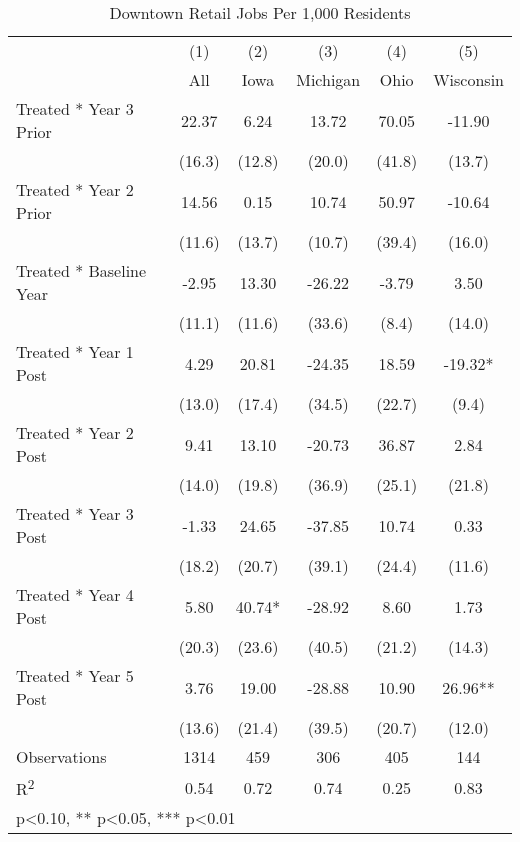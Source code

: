 \begin{table}[htbp]\centering
\def\sym#1{\ifmmode^{#1}\else\(^{#1}\)\fi}
\caption{Downtown Retail Jobs Per 1,000 Residents}
\begin{tabular}{l*{5}{c}}
\toprule
            &\multicolumn{1}{c}{(1)}   &\multicolumn{1}{c}{(2)}   &\multicolumn{1}{c}{(3)}   &\multicolumn{1}{c}{(4)}   &\multicolumn{1}{c}{(5)}   \\
            &         All   &        Iowa   &    Michigan   &        Ohio   &   Wisconsin   \\
\midrule
Treated * Year 3 Prior&       22.37   &        6.24   &       13.72   &       70.05   &      -11.90   \\
            &      (16.3)   &      (12.8)   &      (20.0)   &      (41.8)   &      (13.7)   \\
Treated * Year 2 Prior&       14.56   &        0.15   &       10.74   &       50.97   &      -10.64   \\
            &      (11.6)   &      (13.7)   &      (10.7)   &      (39.4)   &      (16.0)   \\
Treated * Baseline Year&       -2.95   &       13.30   &      -26.22   &       -3.79   &        3.50   \\
            &      (11.1)   &      (11.6)   &      (33.6)   &       (8.4)   &      (14.0)   \\
Treated * Year 1 Post&        4.29   &       20.81   &      -24.35   &       18.59   &      -19.32*  \\
            &      (13.0)   &      (17.4)   &      (34.5)   &      (22.7)   &       (9.4)   \\
Treated * Year 2 Post&        9.41   &       13.10   &      -20.73   &       36.87   &        2.84   \\
            &      (14.0)   &      (19.8)   &      (36.9)   &      (25.1)   &      (21.8)   \\
Treated * Year 3 Post&       -1.33   &       24.65   &      -37.85   &       10.74   &        0.33   \\
            &      (18.2)   &      (20.7)   &      (39.1)   &      (24.4)   &      (11.6)   \\
Treated * Year 4 Post&        5.80   &       40.74*  &      -28.92   &        8.60   &        1.73   \\
            &      (20.3)   &      (23.6)   &      (40.5)   &      (21.2)   &      (14.3)   \\
Treated * Year 5 Post&        3.76   &       19.00   &      -28.88   &       10.90   &       26.96** \\
            &      (13.6)   &      (21.4)   &      (39.5)   &      (20.7)   &      (12.0)   \\
\midrule
Observations &        1314   &         459   &         306   &         405   &         144   \\
R\textsuperscript{2} &        0.54   &        0.72   &        0.74   &        0.25   &        0.83   \\
\bottomrule
\multicolumn{6}{l}{\footnotesize * p<0.10, ** p<0.05, *** p<0.01}\\
\end{tabular}
\end{table}

